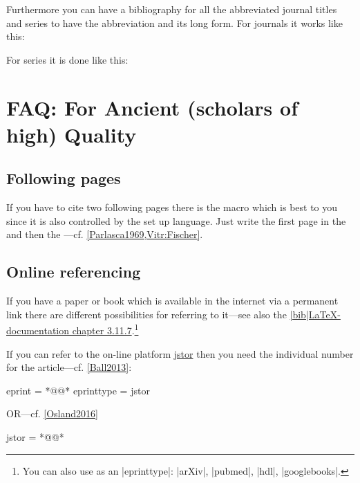 \documentclass[a4paper,
10pt,
greek,
french,
spanish,
italian,
ngerman,
english
]{ltxdoc}
\begin{document}
\begin{refsection}
Furthermore you can have a bibliography for all the abbreviated journal titles and series to have the abbreviation and its long form.
For journals it works like this:
\begin{example}
\end{example}

For series it is done like this:
\begin{example}
\end{example}
\end{refsection}


\section{FAQ: For  Ancient (scholars of high) Quality}
\subsection{Following pages}
\DescribeMacro{\psq} If you have to cite two following pages there is the macro  which is best to you since it is also controlled by the set up language.
Just write the first page in the  and then the ---cf. \cref{Parlasca1969,Vitr:Fischer}.

\subsection{Online referencing}
 If you have a paper or book which is available 
in the internet via a permanent link there are different possibilities for referring to it---see also the
 \href{http://tug.ctan.org/macros/latex/exptl/biblatex/doc/biblatex.pdf}{|bib|\LaTeX-documentation chapter 3.11.7}.\footnote{You can also use as an |eprinttype|: |arXiv|, |pubmed|, |hdl|, |googlebooks|.
}

 If you can refer to the on-line platform \href{www.jstor.org}{jstor} then you need the individual number for the article---cf. \cref{Ball2013}:
\begin{code}
eprint = *@@*
eprinttype = {jstor} 
\end{code}      
OR---cf. \cref{Osland2016}
\begin{code}
jstor = *@@*
\end{code}  
\end{document}
